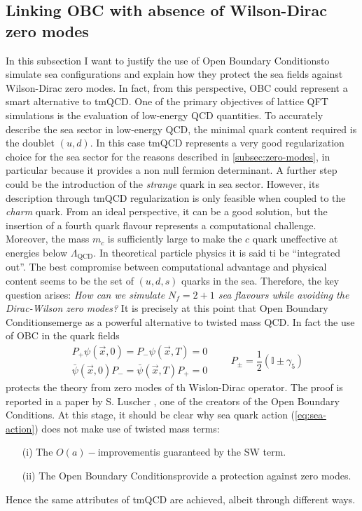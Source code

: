 \documentclass[english, LaM, oneside, noexaminfo]{sapthesis}
\newcommand{\oait}{$O(a)-$improvement}
\newcommand{\obc}{Open Boundary Conditions}
\begin{document}
\subsection{Linking OBC with absence of Wilson-Dirac zero modes}
\noindent
In this subsection I want to justify the use of \obc\space to simulate sea configurations and explain how they protect the sea fields against Wilson-Dirac zero modes.
In fact, from this perspective, OBC could represent a smart alternative to tmQCD.
\newline 
One of the primary objectives of lattice QFT simulations is the evaluation of low-energy QCD quantities.
To accurately describe the sea sector in low-energy QCD, the minimal quark content required is the doublet $(u, d)$.
In this case tmQCD represents a very good regularization choice for the sea sector for the reasons described in \ref{subsec:zero-modes}, in particular because it provides a non null fermion determinant.
\newline
A further step could be the introduction of the {\it strange} quark in sea sector.
However, its description through tmQCD regularization is only feasible when coupled to the {\it charm} quark.
From an ideal perspective, it can be a good solution, but the insertion of a fourth quark flavour represents a computational challenge.
Moreover, the mass $m_c$ is sufficiently large to make the $c$ quark uneffective at energies below $\Lambda_{\text{QCD}}$.
In theoretical particle physics it is said ti be ``integrated out''.
The best compromise between computational advantage and physical content seems to be the set of $(u,d,s)$ quarks in the sea.
\newline
Therefore, the key question arises: \textit{How can we simulate $N_f = 2+1$ sea flavours while avoiding the Dirac-Wilson zero modes?}
It is precisely at this point that \obc\space emerge as a powerful alternative to twisted mass QCD. 
In fact the use of OBC in the quark fields
\begin{equation*}
    \begin{aligned}
        & P_+ \psi (\vec x, 0) = P_- \psi (\vec x, T) = 0 \\
        & \bar\psi (\vec x, 0) P_- = \bar\psi (\vec x, T) P_+ = 0 
    \end{aligned}
    \quad\quad P_{\pm} = \frac{1}{2}\left(\mathbb{I} \pm \gamma_5 \right)
\end{equation*}
protects the theory from zero modes of th Wislon-Dirac operator.
The proof is reported in a paper by S. Luscher \cite{SF-luscher}, one of the creators of the \obc.
\newline
At this stage, it should be clear why sea quark action (\ref{eq:sea-action}) does not make use of twisted mass terms:
\begin{itemize}
    \item [(i)] The \oait\space is guaranteed by the SW term.
    \item [(ii)] The \obc\space provide a protection against zero modes.
\end{itemize}
Hence the same attributes of tmQCD are achieved, albeit through different ways.
\end{document}
